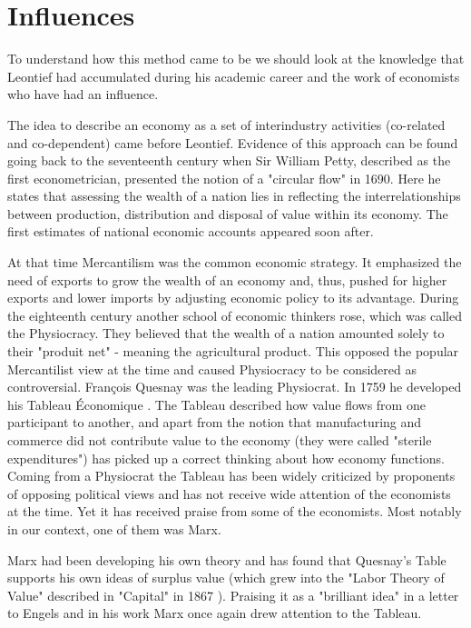 \documentclass[12pt,a4paper]{scrartcl}
\begin{document}
	\section{Influences} \label{influences}
	
	To understand how this method came to be we should look at the knowledge that Leontief had accumulated during his academic career and the work of economists who have had an influence. 
	
	The idea to describe an economy as a set of interindustry activities (co-related and co-dependent) came before Leontief. Evidence of this approach can be found going back to the seventeenth century when Sir William Petty, described as the first econometrician, presented the notion of a "circular flow" in 1690. Here he states that assessing the wealth of a nation lies in reflecting the interrelationships between production, distribution and disposal of value within its economy. The first estimates of national economic accounts appeared soon after.
	
	At that time Mercantilism was the common economic strategy. It emphasized the need of exports to grow the wealth of an economy and, thus, pushed for higher exports and lower imports by adjusting economic policy to its advantage. During the eighteenth century another school of economic thinkers rose, which was called the Physiocracy. They believed that the wealth of a nation amounted solely to their "produit net" - meaning the agricultural product. This opposed the popular Mercantilist view at the time and caused Physiocracy to be considered as controversial. François Quesnay was the leading Physiocrat. In 1759 he developed his Tableau Économique . The Tableau described how value flows from one participant to another, and apart from the notion that manufacturing and commerce did not contribute value to the economy (they were called "sterile expenditures") has picked up a correct thinking about how economy functions. Coming from a Physiocrat the Tableau has been widely criticized by proponents of opposing political views and has not receive wide attention of the economists at the time. Yet it has received praise from some of the economists. Most notably in our context, one of them was Marx. \cite[pp.724-732]{Miller2009}
	
	Marx had been developing his own theory and has found that Quesnay's Table supports his own ideas of surplus value (which grew into the "Labor Theory of Value" described in "Capital" in 1867 \cite[]{Marx1887}). Praising it as a "brilliant idea" in a letter to Engels \cite[p.144]{Baumol2000} and in his work Marx once again drew attention to the Tableau.
	
\end{document}
